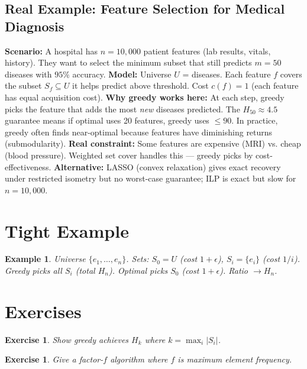 \documentclass[11pt,oneside]{book}
\newtheorem{example}[theorem]{Example}
\newtheorem{exercise}[theorem]{Exercise}
\begin{document}
\subsection*{Real Example: Feature Selection for Medical Diagnosis}
\textbf{Scenario:} A hospital has $n=10,000$ patient features (lab results, vitals, history). They want to select the minimum subset that still predicts $m=50$ diseases with $95\%$ accuracy.
\textbf{Model:} Universe $U$ = diseases. Each feature $f$ covers the subset $S_f \subseteq U$ it helps predict above threshold. Cost $c(f) = 1$ (each feature has equal acquisition cost).
\textbf{Why greedy works here:} At each step, greedy picks the feature that adds the most \emph{new} diseases predicted. The $H_{50} \approx 4.5$ guarantee means if optimal uses 20 features, greedy uses $\leq 90$. In practice, greedy often finds near-optimal because features have diminishing returns (submodularity).
\textbf{Real constraint:} Some features are expensive (MRI) vs. cheap (blood pressure). Weighted set cover handles this — greedy picks by cost-effectiveness.
\textbf{Alternative:} LASSO (convex relaxation) gives exact recovery under restricted isometry but no worst-case guarantee; ILP is exact but slow for $n=10,000$.

\section{Tight Example}

\begin{example}
Universe $\{e_1, \dots, e_n\}$. Sets: $S_0 = U$ (cost $1+\epsilon$), $S_i = \{e_i\}$ (cost $1/i$). Greedy picks all $S_i$ (total $H_n$). Optimal picks $S_0$ (cost $1+\epsilon$). Ratio $\to H_n$.
\end{example}

\section{Exercises}
\begin{exercise}
Show greedy achieves $H_k$ where $k = \max_i |S_i|$.
\end{exercise}
\begin{exercise}
Give a factor-$f$ algorithm where $f$ is maximum element frequency.
\end{exercise}

\setcounter{chapter}{2}
\end{document}
